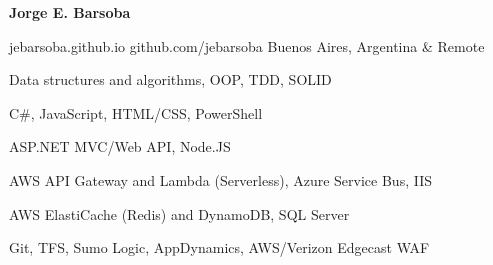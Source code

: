 \documentclass[11pt]{article} %
\begin{document}
\centerline{{\Huge \bf Jorge E. Barsoba}}

\bigskip

        {jebarsoba.github.io}
        {github.com/jebarsoba}
        {Buenos Aires, Argentina \& Remote}


      {Data structures and algorithms, OOP, TDD, SOLID}

      {C\#, JavaScript, HTML/CSS, PowerShell}

      {ASP.NET MVC/Web API, Node.JS}

      {AWS API Gateway and Lambda (Serverless), Azure Service Bus, IIS}

      {AWS ElastiCache (Redis) and DynamoDB, SQL Server}

      {Git, TFS, Sumo Logic, AppDynamics, AWS/Verizon Edgecast WAF}

\end{document}
